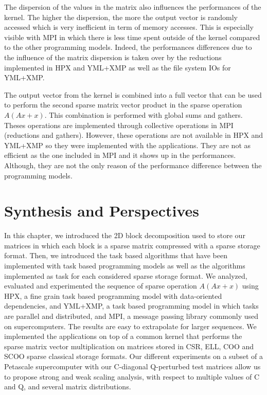 The dispersion of the values in the matrix also influences the performances of the kernel.
The higher the dispersion, the more the output vector is randomly accessed which is very inefficient in term of memory accesses.
This is especially visible with MPI in which there is less time spent outside of the kernel compared to the other programming models.
Indeed, the performances differences due to the influence of the matrix dispersion is taken over by the reductions implemented in HPX and YML+XMP as well as the file system IOs for YML+XMP.

The output vector from the kernel is combined into a full vector that can be used to perform the second sparse matrix vector product in the sparse operation $A(Ax+x)$.
This combination is performed with global sums and gathers.
Theses operations are implemented through collective operations in MPI (reductions and gathers).
However, these operations are not available in HPX and YML+XMP so they were implemented with the applications.
They are not as efficient as the one included in MPI and it shows up in the performances.
Although, they are not the only reason of the performance difference between the programming models.

\section{Synthesis and Perspectives}
In this chapter, we introduced the 2D block decomposition used to store our matrices in which each block is a sparse matrix compressed with a sparse storage format.
Then, we introduced the task based algorithms that have been implemented with task based programming models as well as the algorithms implemented as task for each considered sparse storage format.
We analyzed, evaluated and experimented the sequence of sparse operation $A(Ax+x)$ using HPX, a fine grain task based programming model with data-oriented dependencies, and YML+XMP, a task based programming model in which tasks are parallel and distributed, and MPI, a message passing library commonly used on supercomputers.
The results are easy to extrapolate for larger sequences.
We implemented the applications on top of a common kernel that performs the sparse matrix vector multiplication on matrices stored in CSR, ELL, COO and SCOO sparse classical storage formats.
Our different experiments on a subset of a Petascale supercomputer with our C-diagonal Q-perturbed test matrices allow us to propose strong and weak scaling analysis, with respect to multiple values of C and Q,  and several matrix distributions.

